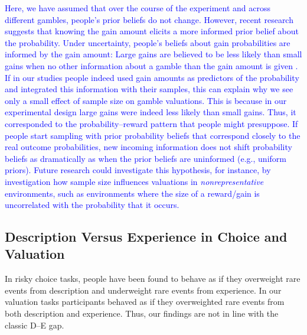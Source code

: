\documentclass[a4paper, man, natbib, floatsintext]{apa6} %
\begin{document}
\textcolor{blue}{
Here, we have assumed that over the course of the experiment and across different gambles, people's prior beliefs do not change. However, recent research suggests that knowing the gain amount elicits a more informed prior belief about the probability. Under uncertainty, people's beliefs about gain probabilities are informed by the gain amount: Large gains are believed to be less likely than small gains when no other information about a gamble than the gain amount is given \citep{Pleskac2014, Hoffart2018}. If in our studies people indeed used gain amounts as predictors of the probability and integrated this information with their samples, this can explain why we see only a small effect of sample size on gamble valuations. This is because in our experimental design large gains were indeed less likely than small gains. Thus, it corresponded to the probability--reward pattern that people might presuppose. If people start sampling with prior probability beliefs that correspond closely to the real outcome probabilities, new incoming information does not shift probability beliefs as dramatically as when the prior beliefs are uninformed (e.g., uniform priors). Future research could investigate this hypothesis, for instance, by investigation how sample size influences valuations in \textit{nonrepresentative} environments, such as environments where the size of a reward/gain is uncorrelated with the probability that it occurs. }

\subsection{Description Versus Experience in Choice and Valuation}
In risky choice tasks, people have been found to behave as if they overweight rare events from description and underweight rare events from experience. In our valuation tasks participants behaved as if they overweighted rare events from both description and experience. Thus, our findings are not in line with the classic D--E gap.
\end{document}
